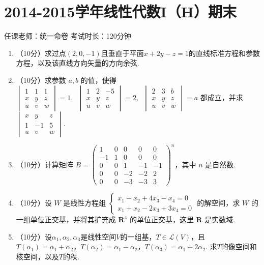 \section{2014-2015学年线性代数I（H）期末}

\begin{center}
    任课老师：统一命卷\hspace{4em} 考试时长：120分钟
\end{center}

\begin{enumerate}
    \item （10分）求过点$(2,0,-1)$且垂直于平面$x+2y-z=1$的直线标准方程和参数方程，以及该直线方向矢量的方向余弦.
	\item （10分）求参数 $a, b$  的值，使得 $\begin{vmatrix}1 & 1 & 1 \\ x & y & z \\u & v & w\end{vmatrix}=1,\enspace \begin{vmatrix}1 & 2 & -5 \\ x & y & z \\u & v & w\end{vmatrix}=2,\enspace \begin{vmatrix}2 & 3 & b \\ x & y & z \\u & v & w\end{vmatrix}=a$ 都成立，并求$\begin{vmatrix}x & y & z \\ 1 & -1 & 5 \\u & v & w\end{vmatrix}$.
	\item （10分）计算矩阵 $B=\begin{pmatrix}1 & 0 & 0 & 0 & 0 \\ -1 & 1 & 0 & 0 & 0 \\ 0 & 0 & 1 & -1 & -1 \\ 0 & 0 & -2 & -2 & 2 \\ 0 & 0 & -3 & -3 & 3\end{pmatrix}^n$，其中 $n$ 是自然数.
	\item （10分）设 $W$ 是线性方程组 $\begin{cases}
        x_1-x_2+4x_3-x_4=0 \\ x_1+x_2-2x_3+3x_4=0
    \end{cases}$ 的解空间，求 $W$ 的一组单位正交基，并将其扩充成 $\mathbf{R}^4$ 的单位正交基，这里 $\mathbf{R}$ 是实数域.
	\item （10分）设$\alpha_1,\alpha_2,\alpha_3$是线性空间$V$的一组基，$T\in\mathcal{L}(V)$，且$T(\alpha_1)=\alpha_1+\alpha_2$，$T(\alpha_2)=\alpha_1-\alpha_2$，$T(\alpha_3)=\alpha_1+2\alpha_2$. 求$T$的像空间和核空间，以及$T$的秩.

\end{enumerate}
